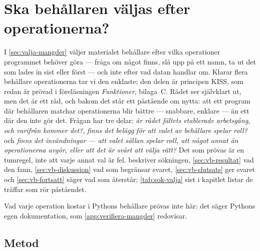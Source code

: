 \chapter{Ska behållaren väljas efter operationerna?}
\label{app:valja-behallare}

I \cref{sec:valja-mangder} väljer materialet behållare efter vilka
operationer programmet behöver göra --- fråga om något finns, slå upp
på ett namn, ta ut det som lades in sist eller först --- och inte efter
vad datan handlar om.  Klarar flera behållare operationerna tar vi den
enklaste; den delen är principen KISS, som redan är prövad i
föreläsningen \emph{Funktioner}, bilaga~C.  Rådet ser självklart ut,
men det är ett råd, och bakom det står ett påstående om nytta: att ett
program där behållaren matchar operationerna blir bättre --- snabbare,
enklare --- än ett där den inte gör det.  Frågan har tre delar:
\emph{är rådet fältets etablerade arbetsgång, och varifrån kommer
det?}, \emph{finns det belägg för att valet av behållare spelar roll?}
och \emph{finns det invändningar --- att valet sällan spelar roll, att
något annat än operationerna avgör, eller att det är svårt att välja
rätt?}  Det som prövas är en tumregel, inte att varje annat val är fel.
 beskriver sökningen, \cref{sec:vb-resultat} vad den
fann, \cref{sec:vb-diskussion} vad som begränsar svaret,
\cref{sec:vb-slutsats} ger svaret och \cref{sec:vb-fortsatt} säger vad
som återstår; \cref{tab:sok-valja} sist i kapitlet listar de träffar som
rör påståendet.

Vad varje operation kostar i Pythons behållare prövas inte här: det
säger Pythons egen dokumentation, som \cref{app:verifiera-mangder}
redovisar.

\section{Metod}
\label{sec:vb-metod}

